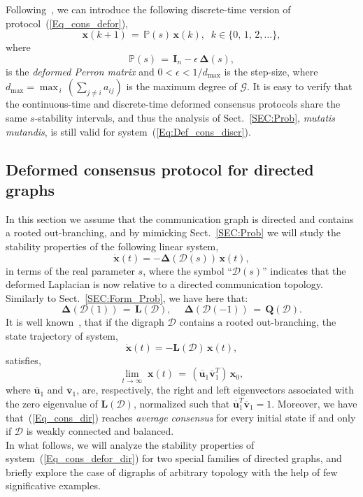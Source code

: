 \documentclass[letterpaper,9pt,twocolumn]{autart}
\newcommand{\vet}[1]{\ensuremath{{\mathbf #1}}}
\begin{document}
Following~\cite[Sect.~IIC]{OlfatiFaMu_IEEE07}, we can introduce the following discrete-time
version of protocol~(\ref{Eq_cons_defor}),
\begin{equation}\label{Eq:Def_cons_discr}
\vet{x}(k+1) \,=\, \mathds{P}(s)\,\vet{x}(k),\;\; k \in \{0,\,1,\,2,\ldots\},
\end{equation}
where
$$
\mathds{P}(s) \,=\, \vet{I}_n - \epsilon\,\boldsymbol{\Delta}(s),
$$
is the \emph{deformed Perron matrix} and $0 < \epsilon < 1/d_{\max}$ is the step-size,
where $d_{\max} = \max_{\,i}\, (\sum_{j \neq i} a_{ij})$ is the maximum
degree of $\mathcal{G}$.
It is easy to verify that the continuous-time and discrete-time deformed consensus protocols
share the same $s$-stability intervals, and thus the analysis of
Sect.~\ref{SEC:Prob}, \emph{mutatis mutandis}, is still valid
for system~(\ref{Eq:Def_cons_discr}).

\subsection{Deformed consensus protocol for directed graphs}\label{Sect:ext_Direct}

In this section we assume that the communication graph is directed 
and contains a rooted out-branching, and by mimicking Sect.~\ref{SEC:Prob} we will study the stability properties
of the following linear system,
\begin{equation}\label{Eq_cons_defor_dir}
\dot{\vet{x}}(t) = -\boldsymbol{\Delta}(\mathcal{D}(s))\,\vet{x}(t),
\end{equation}
in terms of the real parameter $s$, where the symbol ``$\mathcal{D}(s)$''
indicates that the deformed Laplacian is now relative to a directed communication topology.
Similarly to Sect.~\ref{SEC:Form_Prob}, we have here that:
$$
\boldsymbol{\Delta}(\mathcal{D}(1)) \,=\, \vet{L}(\mathcal{D}),\quad\; \boldsymbol{\Delta}(\mathcal{D}(-1)) \,=\, \vet{Q}(\mathcal{D}).
$$
It is well known~\cite{MesbahiEg_book10}, that if the digraph $\mathcal{D}$ contains a rooted out-branching, the
state trajectory of system,
\begin{equation}\label{Eq_cons_dir}
\dot{\vet{x}}(t) = -\vet{L}(\mathcal{D})\,\vet{x}(t),
\end{equation}
satisfies,
$$
\lim_{t \rightarrow \infty}\; \vet{x}(t) \,=\, (\overline{\vet{u}}_1 \overline{\vet{v}}^T_1)\,\vet{x}_0,
$$
where $\overline{\vet{u}}_1$ and $\overline{\vet{v}}_1$, are, respectively, the right and
left eigenvectors associated with the zero eigenvalue
of $\vet{L}(\mathcal{D})$, normalized such that $\overline{\vet{u}}^T_1\overline{\vet{v}}_1 = 1$. Moreover, we have
that~(\ref{Eq_cons_dir}) reaches \emph{average consensus} for every
initial state if and only if $\mathcal{D}$ is weakly connected and balanced.\\
In what follows, we will analyze the stability properties of system~(\ref{Eq_cons_defor_dir}) for
two special families of directed graphs, and briefly explore the case of digraphs of arbitrary topology with
the help of few significative examples.
\end{document}
